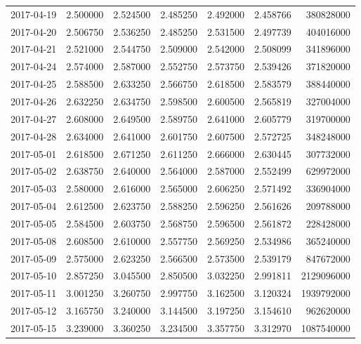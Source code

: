 \begin{tabular}{lrrrrrr}
2017-04-19 &    2.500000 &    2.524500 &    2.485250 &    2.492000 &    2.458766 &   380828000 \\
2017-04-20 &    2.506750 &    2.536250 &    2.485250 &    2.531500 &    2.497739 &   404016000 \\
2017-04-21 &    2.521000 &    2.544750 &    2.509000 &    2.542000 &    2.508099 &   341896000 \\
2017-04-24 &    2.574000 &    2.587000 &    2.552750 &    2.573750 &    2.539426 &   371820000 \\
2017-04-25 &    2.588500 &    2.633250 &    2.566750 &    2.618500 &    2.583579 &   388440000 \\
2017-04-26 &    2.632250 &    2.634750 &    2.598500 &    2.600500 &    2.565819 &   327004000 \\
2017-04-27 &    2.608000 &    2.649500 &    2.589750 &    2.641000 &    2.605779 &   319700000 \\
2017-04-28 &    2.634000 &    2.641000 &    2.601750 &    2.607500 &    2.572725 &   348248000 \\
2017-05-01 &    2.618500 &    2.671250 &    2.611250 &    2.666000 &    2.630445 &   307732000 \\
2017-05-02 &    2.638750 &    2.640000 &    2.564000 &    2.587000 &    2.552499 &   629972000 \\
2017-05-03 &    2.580000 &    2.616000 &    2.565000 &    2.606250 &    2.571492 &   336904000 \\
2017-05-04 &    2.612500 &    2.623750 &    2.588250 &    2.596250 &    2.561626 &   209788000 \\
2017-05-05 &    2.584500 &    2.603750 &    2.568750 &    2.596500 &    2.561872 &   228428000 \\
2017-05-08 &    2.608500 &    2.610000 &    2.557750 &    2.569250 &    2.534986 &   365240000 \\
2017-05-09 &    2.575000 &    2.623250 &    2.566500 &    2.573500 &    2.539179 &   847672000 \\
2017-05-10 &    2.857250 &    3.045500 &    2.850500 &    3.032250 &    2.991811 &  2129096000 \\
2017-05-11 &    3.001250 &    3.260750 &    2.997750 &    3.162500 &    3.120324 &  1939792000 \\
2017-05-12 &    3.165750 &    3.240000 &    3.144500 &    3.197250 &    3.154610 &   962620000 \\
2017-05-15 &    3.239000 &    3.360250 &    3.234500 &    3.357750 &    3.312970 &  1087540000 \\

\end{tabular}
